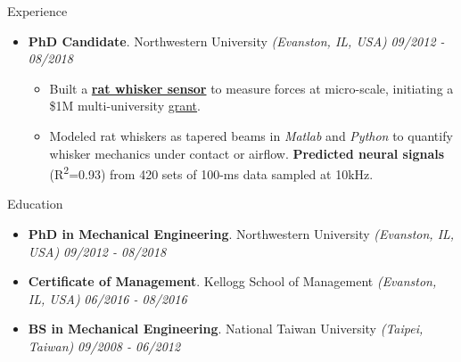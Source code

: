 \documentclass{resume} %
\begin{document}
\begin{rSection}{Experience}
\begin{itemize}[leftmargin=0em]
			\item {\bf PhD Candidate}{. Northwestern University \textit{(Evanston, IL, USA)}} \hfill {\em 09/2012 - 08/2018}\\
			\vspace{-5mm}
			\begin{itemize}
				\setlength\itemsep{-1.75em}
				\item Built a \textbf{\href{https://aety.github.io/rat-whisker-sensor/}{rat whisker sensor}} to measure forces at micro-scale, initiating a \$1M multi-university \href{https://www.nsf.gov/news/mmg/mmg_disp.jsp?med_id=132588}{grant}.\\
				\item Modeled rat whiskers as tapered beams in \textit{Matlab} and \textit{Python} to quantify whisker mechanics under contact or airflow. \textbf{Predicted neural signals} (R\textsuperscript{2}=0.93) from 420 sets of 100-ms data sampled at 10kHz.
			\end{itemize}
			
			
		\end{itemize}
		
	\end{rSection}
	
	
	
	\begin{rSection}{Education}
		\begin{itemize}[leftmargin=0em]
			\item {\bf PhD in Mechanical Engineering}{. Northwestern University} \textit{(Evanston, IL, USA)} \hfill {\em 09/2012 - 08/2018} 
			\vspace{-0mm}
			\item {\bf Certificate of Management}{. Kellogg School of Management} \textit{(Evanston, IL, USA)} \hfill {\em 06/2016 - 08/2016} 
			\vspace{-0mm}
			\item {\bf BS in Mechanical Engineering}{. National Taiwan University} \textit{(Taipei, Taiwan)} \hfill {\em 09/2008 - 06/2012} 
			\vspace{-0mm}
		\end{itemize}
				
	\end{rSection}
	
\end{document}
